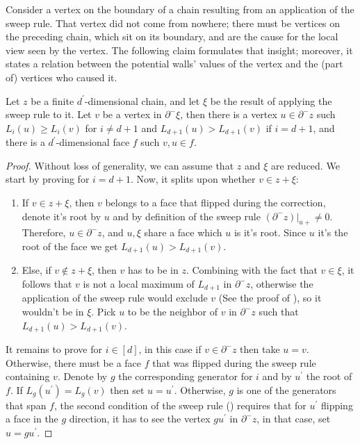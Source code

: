 Consider a vertex on the boundary of a chain resulting from an application of the sweep rule. That vertex did not come from nowhere; there must be vertices on the preceding chain, which sit on its boundary, and are the cause for the local view seen by the vertex. The following claim formulates that insight; moreover, it states a relation between the potential walls' values of the vertex and the (part of) vertices who caused it.
\begin{claim} 
  \label{claim:sweepface}
  Let $z$ be a finite $d^{\prime}$-dimensional chain, and let $\xi$ be the result of applying the sweep rule to it. Let $v$ be a vertex in $\partial^{-}\xi$, then there is a vertex $u \in \partial^{-}z$ such $L_{i}(u)\ge L_{i}(v)$ for $i\neq d+1$ and  $L_{d+1}(u) > L_{d+1}(v)$ if $i=d+1$,  and there is a $d^{\prime}$-dimensional face $f$ such $v,u \in f$. 
\end{claim}
\begin{proof}
Without loss of generality, we can assume that $z$ and $\xi$ are reduced. We start by proving for $i = d + 1$. Now, it splits upon whether $v \in z + \xi$:
  \begin{enumerate}
    \item If $v\in z + \xi$, then $v$ belongs to a face that flipped during the correction, denote it's root by $u$ and by definition of the sweep rule $(\partial^{-} z)|_{u+} \neq 0$. Therefore, $u \in \partial^{-}z$, and $u,\xi$ share a face which $u$ is it's root. Since $u$ it's the root of the face we get $L_{d+1}(u) > L_{d+1}(v)$. 
    \item Else, if $v \notin z + \xi$, then $v$ has to be in $z$. Combining with the fact that $v \in \xi$, it follows that $v$ is not a local maximum of $L_{d+1}$ in $\partial^{-}z$, otherwise the application of the sweep rule would exclude $v$ (See the proof of ), so it wouldn't be in $\xi$. Pick $u$ to be the neighbor of $v$ in $\partial^{-}z$ such that $L_{d+1}(u) > L_{d+1}(v)$.
  \end{enumerate}
  It remains to prove for $i\in [d]$, in this case if $v \in \partial^{-}z$ then take $u = v$. Otherwise, there must be a face $f$ that was flipped during the sweep rule containing $v$. Denote by $g$ the corresponding generator for $i$ and by $u^{\prime}$ the root of $f$. If $L_{g}(u^{\prime}) = L_{g}(v)$ then set $u = u^{\prime}$. Otherwise, $g$ is one of the generators that span $f$, the second condition of the sweep rule () requires that for $u^\prime$ flipping a face in the $g$ direction, it has to see the vertex $gu^{\prime}$ in $\partial^{-}z$, in that case, set $u=gu^{\prime}$.
\end{proof}




